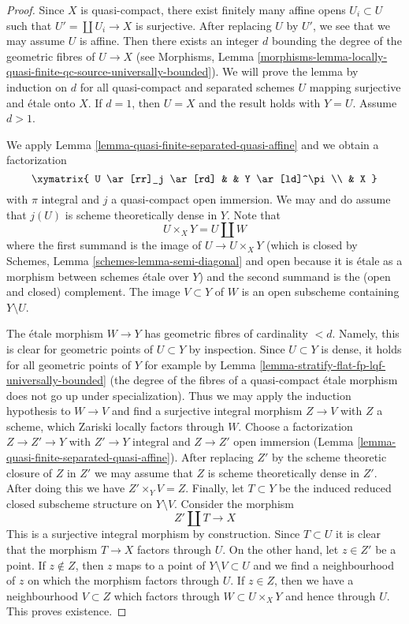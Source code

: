 \begin{proof}
Since $X$ is quasi-compact, there exist finitely many affine opens
$U_i \subset U$ such that $U' = \coprod U_i \to X$ is surjective.
After replacing $U$ by $U'$, we see that we may assume $U$ is affine.
Then there exists an integer $d$ bounding the degree of the geometric
fibres of $U \to X$ (see Morphisms, Lemma
\ref{morphisms-lemma-locally-quasi-finite-qc-source-universally-bounded}).
We will prove the lemma by induction on $d$ for all quasi-compact
and separated schemes $U$ mapping surjective and \'etale onto $X$.
If $d = 1$, then $U = X$ and the result holds with $Y = U$.
Assume $d > 1$.

\medskip\noindent
We apply Lemma \ref{lemma-quasi-finite-separated-quasi-affine}
and we obtain a factorization
$$
\xymatrix{
U \ar[rr]_j \ar[rd] & & Y \ar[ld]^\pi \\
& X
}
$$
with $\pi$ integral and $j$ a quasi-compact open immersion. We may and do
assume that $j(U)$ is scheme theoretically dense in $Y$. Note that
$$
U \times_X Y = U \amalg W
$$
where the first summand is the image of $U \to U \times_X Y$
(which is closed by
Schemes, Lemma \ref{schemes-lemma-semi-diagonal}
and open because it is \'etale as a morphism between schemes \'etale over $Y$)
and the second summand is the (open and closed) complement.
The image $V \subset Y$ of $W$ is an open subscheme containing
$Y \setminus U$.

\medskip\noindent
The \'etale morphism $W \to Y$ has geometric fibres of cardinality $< d$.
Namely, this is clear for geometric points of $U \subset Y$ by inspection.
Since $U \subset Y$ is dense, it holds for all geometric points of $Y$
for example by Lemma
\ref{lemma-stratify-flat-fp-lqf-universally-bounded}
(the degree of the fibres of a quasi-compact \'etale morphism
does not go up under specialization). Thus we may apply the induction
hypothesis to $W \to V$ and find a surjective integral morphism
$Z \to V$ with $Z$ a scheme, which Zariski locally factors through $W$.
Choose a factorization $Z \to Z' \to Y$ with $Z' \to Y$ integral and
$Z \to Z'$ open immersion
(Lemma \ref{lemma-quasi-finite-separated-quasi-affine}).
After replacing $Z'$ by the scheme theoretic closure of $Z$ in $Z'$
we may assume that $Z$ is scheme theoretically dense in $Z'$.
After doing this we have $Z' \times_Y V = Z$. Finally,
let $T \subset Y$ be the induced reduced closed subscheme structure
on $Y \setminus V$. Consider the morphism
$$
Z' \amalg T \longrightarrow X
$$
This is a surjective integral morphism by construction.
Since $T \subset U$ it is clear that the morphism $T \to X$
factors through $U$. On the other hand, let $z \in Z'$
be a point. If $z \not \in Z$, then $z$ maps to a point of
$Y \setminus V \subset U$ and we find a neighbourhood of $z$
on which the morphism factors through $U$.
If $z \in Z$, then we have a neighbourhood $V \subset Z$
which factors through $W \subset U \times_X Y$ and hence through $U$.
This proves existence.


\end{proof}
